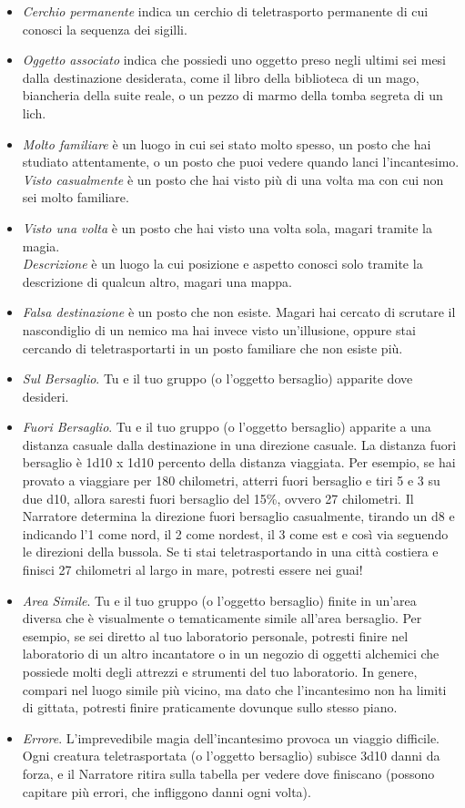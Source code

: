 \begin{multicols}{2}
\begin{itemize}[leftmargin=*] \setlength{\itemsep}{0pt}
	\item \emph{Cerchio permanente} indica un cerchio di teletrasporto permanente di cui conosci la sequenza dei sigilli.
	\item \emph{Oggetto associato} indica che possiedi uno oggetto preso negli ultimi sei mesi dalla destinazione desiderata, come il libro della biblioteca di un mago, biancheria della suite reale, o un pezzo di marmo della tomba segreta di un lich.
	\item \emph{Molto familiare} è un luogo in cui sei stato molto spesso, un posto che hai studiato attentamente, o un posto che puoi vedere quando lanci l'incantesimo.
	\emph{Visto casualmente} è un posto che hai visto più di una volta ma con cui non sei molto familiare.
	\item \emph{Visto una volta} è un posto che hai visto una volta sola, magari tramite la magia.\\ \emph{Descrizione} è un luogo la cui posizione e aspetto conosci solo tramite la descrizione di qualcun altro, magari una mappa.
	\item \emph{Falsa destinazione} è un posto che non esiste. Magari hai cercato di scrutare il nascondiglio di un nemico ma hai invece visto un'illusione, oppure stai cercando di teletrasportarti in un posto familiare che non esiste più.
	\item \emph{Sul Bersaglio}. Tu e il tuo gruppo (o l'oggetto bersaglio) apparite dove desideri.
	\item \emph{Fuori Bersaglio}. Tu e il tuo gruppo (o l'oggetto bersaglio) apparite a una distanza casuale dalla destinazione in una direzione casuale. La distanza fuori bersaglio è 1d10 x 1d10 percento della distanza viaggiata. Per esempio, se hai provato a viaggiare per 180 chilometri, atterri fuori bersaglio e tiri 5 e 3 su due d10, allora saresti fuori bersaglio del 15\%, ovvero 27 chilometri. Il Narratore determina la direzione fuori bersaglio casualmente, tirando un d8 e indicando l'1 come nord, il 2 come nordest, il 3 come est e così via seguendo le direzioni della bussola. Se ti stai teletrasportando in una città costiera e finisci 27 chilometri al largo in mare, potresti essere nei guai!
	\item \emph{Area Simile}. Tu e il tuo gruppo (o l'oggetto bersaglio) finite in un'area diversa che è visualmente o tematicamente simile all'area bersaglio. Per esempio, se sei diretto al tuo laboratorio personale, potresti finire nel laboratorio di un altro incantatore o in un negozio di oggetti alchemici che possiede molti degli attrezzi e strumenti del tuo laboratorio. In genere, compari nel luogo simile più vicino, ma dato che l'incantesimo non ha limiti di gittata, potresti finire praticamente dovunque sullo stesso piano.
	\item \emph{Errore}. L'imprevedibile magia dell'incantesimo provoca un viaggio difficile. Ogni creatura teletrasportata (o l'oggetto bersaglio) subisce 3d10 danni da forza, e il Narratore ritira sulla tabella per vedere dove finiscano (possono capitare più errori, che infliggono danni ogni volta).
\end{itemize}


\end{multicols}
